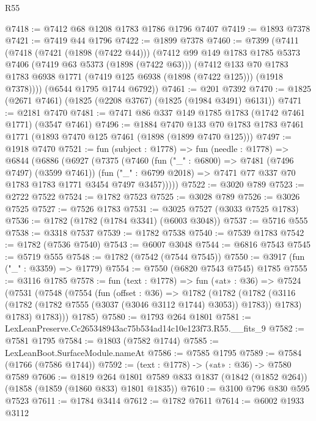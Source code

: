 \begin{lexlean}{R55}
\begin{coremodule}
@7418 := @7412 @68 @1208 @1783 @1786 @1796 @7407
@7419 := @1893 @7378
@7421 := @7419 @44 @1796
@7422 := @1899 @7378
@7460 := @7399
    (@7411
      (@7418
        (@7421 (@1898 (@7422 @44)))
        (@7412
          @99
          @149
          @1783
          @1785
          @5373
          @7406
          (@7419 @63 @5373 (@1898 (@7422 @63)))
          (@7412
            @133
            @70
            @1783
            @1783
            @6938
            @1771
            (@7419 @125 @6938 (@1898 (@7422 @125)))
            (@1918 @7378))))
      (@6544 @1795 @1744 @6792))
@7461 := @201 @7392
@7470 := @1825 (@2671 @7461) (@1825 (@2208 @3767) (@1825 (@1984 @3491) @6131))
@7471 := @2181 @7470
@7481 := @7471 @86 @337 @149 @1785 @1783 (@1742 @7461 @1771) (@3547 @7461)
@7496 := @1884
    @7470
    @133
    @70
    @1783
    @1783
    @7461
    @1771
    (@1893 @7470 @125 @7461 (@1898 (@1899 @7470 @125)))
@7497 := @1918 @7470
@7521 := fun (subject : @1778) =>
  fun (needle : @1778) =>
  @6844
    (@6886
      (@6927
        (@7375
          (@7460
            (fun ("_" : @6800) => @7481 (@7496 @7497) (@3599 @7461))
            (fun ("_" : @6799 @2018) => @7471 @77 @337 @70 @1783 @1783 @1771 @3454 @7497 @3457)))))
@7522 := @3020 @789
@7523 := @2722 @7522
@7524 := @1782 @7523
@7525 := @3028 @789
@7526 := @3026 @7525
@7527 := @7526 @1783
@7531 := @3025 @7527 (@3033 @7525 @1783)
@7536 := @1782 (@1782 (@1784 @3341) (@6003 @3048))
@7537 := @5716 @555
@7538 := @3318 @7537
@7539 := @1782 @7538
@7540 := @7539 @1783
@7542 := @1782 (@7536 @7540)
@7543 := @6007 @3048
@7544 := @6816 @7543
@7545 := @5719 @555
@7548 := @1782 (@7542 (@7544 @7545))
@7550 := @3917 (fun ("_" : @3359) => @1779)
@7554 := @7550 (@6820 @7543 @7545) @1785
@7555 := @3116 @1785
@7578 := fun (text : @1778) =>
  fun («at» : @36) =>
  @7524
    (@7531
      (@7548
        (@7554
          (fun (offset : @36) =>
          @1782
            (@1782
              (@1782 (@3116 (@1782 (@1782 @7555 (@3037 (@3046 @3112 @1744) @3053)) @1783)) @1783)
              @1783)
            @1783)))
      @1785)
@7580 := @1793 @264 @1801
@7581 := LexLeanPreserve.Cc265348943ac75b534ad14c10e123f73.R55.__fits_9
@7582 := @7581 @1795
@7584 := @1803 (@7582 @1744)
@7585 := LexLeanBoot.SurfaceModule.nameAt
@7586 := @7585 @1795
@7589 := @7584 (@1766 (@7586 @1744))
@7592 := (text : @1778) -> («at» : @36) -> @7580 @7589
@7606 := @1819
    @264
    @1801
    @7589
    @833
    @1837
    (@1842 (@1852 @264))
    (@1858 (@1859 (@1860 @833) @1801 @1835))
@7610 := @3100 @796 @830 @595 @7523
@7611 := @1784 @3414
@7612 := @1782 @7611
@7614 := @6002 @1933 @3112

\end{coremodule}
\end{lexlean}

